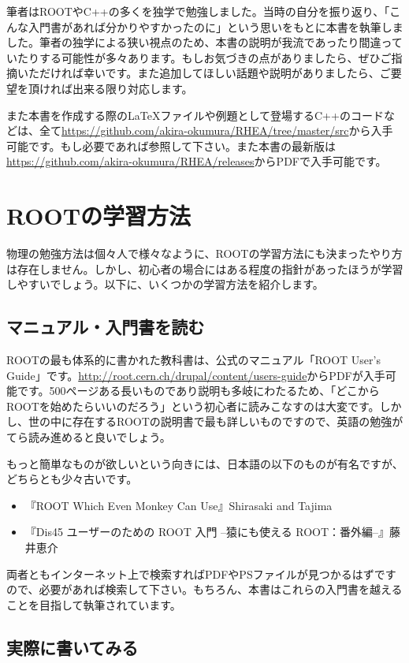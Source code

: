 筆者はROOTやC++の多くを独学で勉強しました。当時の自分を振り返り、「こんな入門書があれば分かりやすかったのに」という思いをもとに本書を執筆しました。筆者の独学による狭い視点のため、本書の説明が我流であったり間違っていたりする可能性が多々あります。もしお気づきの点がありましたら、ぜひご指摘いただければ幸いです。また追加してほしい話題や説明がありましたら、ご要望を頂ければ出来る限り対応します。

また本書を作成する際の{\LaTeX}ファイルや例題として登場するC++のコードなどは、全て\url{https://github.com/akira-okumura/RHEA/tree/master/src}から入手可能です。もし必要であれば参照して下さい。また本書の最新版は\url{https://github.com/akira-okumura/RHEA/releases}からPDFで入手可能です。

\section{ROOTの学習方法}
物理の勉強方法は個々人で様々なように、ROOTの学習方法にも決まったやり方は存在しません。しかし、初心者の場合にはある程度の指針があったほうが学習しやすいでしょう。以下に、いくつかの学習方法を紹介します。
\subsection{マニュアル・入門書を読む}
ROOTの最も体系的に書かれた教科書は、公式のマニュアル「ROOT User's Guide」です。\url{http://root.cern.ch/drupal/content/users-guide}からPDFが入手可能です。500ページある長いものであり説明も多岐にわたるため、「どこからROOTを始めたらいいのだろう」という初心者に読みこなすのは大変です。しかし、世の中に存在するROOTの説明書で最も詳しいものですので、英語の勉強がてら読み進めると良いでしょう。

もっと簡単なものが欲しいという向きには、日本語の以下のものが有名ですが、どちらとも少々古いです。
\begin{itemize}
  \item 『ROOT Which Even Monkey Can Use』Shirasaki and Tajima
  \item 『Dis45 ユーザーのための ROOT 入門 --猿にも使える ROOT：番外編--』藤井恵介
\end{itemize}
両者ともインターネット上で検索すればPDFやPSファイルが見つかるはずですので、必要があれば検索して下さい。もちろん、本書はこれらの入門書を越えることを目指して執筆されています。

\subsection{実際に書いてみる}

